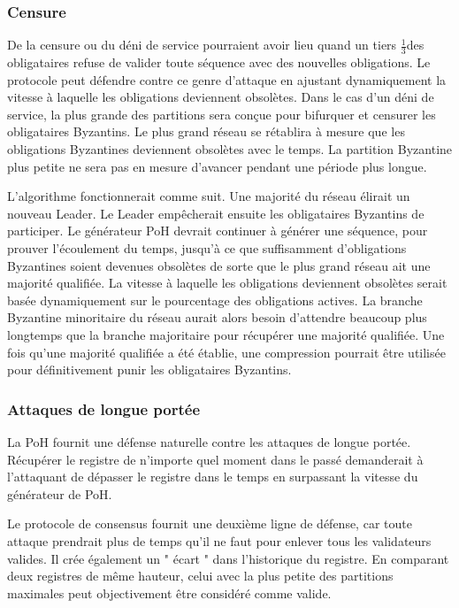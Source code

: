 \documentclass[12pt]{article}
\begin{document}
\subsubsection{Censure}\label{Censure}
De la censure ou du déni de service pourraient avoir lieu quand un tiers \(\frac{1}{3}\)des obligataires refuse de valider toute séquence avec des nouvelles obligations. Le protocole peut défendre contre ce genre d’attaque en ajustant dynamiquement la vitesse à laquelle les obligations deviennent obsolètes. Dans le cas d’un déni de service, la plus grande des partitions sera conçue pour bifurquer et censurer les obligataires Byzantins. Le plus grand réseau se rétablira à mesure que les obligations Byzantines deviennent obsolètes avec le temps. La partition Byzantine plus petite ne sera pas en mesure d’avancer pendant une période plus longue.

L’algorithme fonctionnerait comme suit. Une majorité du réseau élirait un nouveau Leader. Le Leader empêcherait ensuite les obligataires Byzantins de participer. Le générateur PoH devrait continuer à générer une séquence, pour prouver l’écoulement du temps, jusqu’à ce que suffisamment d’obligations Byzantines soient devenues obsolètes de sorte que le plus grand réseau ait une majorité qualifiée. La vitesse à laquelle les obligations deviennent obsolètes serait basée dynamiquement sur le pourcentage des obligations actives. La branche Byzantine minoritaire du réseau aurait alors besoin d’attendre beaucoup plus longtemps que la branche majoritaire pour récupérer une majorité qualifiée. Une fois qu’une majorité qualifiée a été établie, une compression pourrait être utilisée pour définitivement punir les obligataires Byzantins.

\subsubsection{Attaques de longue portée}\label{Censure}
La PoH fournit une défense naturelle contre les attaques de longue portée. Récupérer le registre de n’importe quel moment dans le passé demanderait à l’attaquant de dépasser le registre dans le temps en surpassant la vitesse du générateur de PoH.

Le protocole de consensus fournit une deuxième ligne de défense, car toute attaque prendrait plus de temps qu’il ne faut pour enlever tous les validateurs valides. Il crée également un " écart " dans l’historique du registre. En comparant deux registres de même hauteur, celui avec la plus petite des partitions maximales peut objectivement être considéré comme valide.
\end{document}

